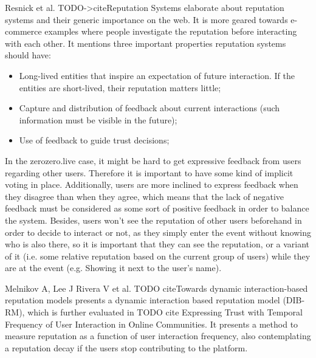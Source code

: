 Resnick et al. TODO->cite{Reputation Systems} elaborate about reputation systems and their generic importance on the web. It is more geared towards e-commerce examples where people investigate the reputation before interacting with each other. It mentions three important properties reputation systems should have:
\begin{itemize}
    \item Long-lived entities that inspire an expectation of future interaction. If the entities are short-lived, their reputation matters little;
    \item Capture and distribution of feedback about current interactions (such information must be visible in the future);
    \item Use of feedback to guide trust decisions;
\end{itemize}
In the zerozero.live case, it might be hard to get expressive feedback from users regarding other users. Therefore it is important to have some kind of implicit voting in place. Additionally, users are more inclined to express feedback when they disagree than when they agree, which means that the lack of negative feedback must be considered as some sort of positive feedback in order to balance the system. Besides, users won't see the reputation of other users beforehand in order to decide to interact or not, as they simply enter the event without knowing who is also there, so it is important that they can see the reputation, or a variant of it (i.e. some relative reputation based on the current group of users) while they are at the event (e.g. Showing it next to the user's name).

Melnikov A, Lee J Rivera V et al. TODO cite{Towards dynamic interaction-based reputation models} presents a dynamic interaction based reputation model (DIB-RM), which is further evaluated in TODO cite {Expressing Trust with Temporal Frequency of User Interaction in Online Communities}. It presents a method to measure reputation as a function of user interaction frequency, also contemplating a reputation decay if the users stop contributing to the platform. 

